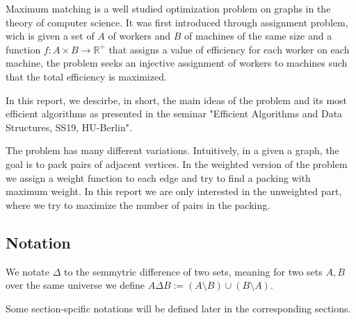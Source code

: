 Maximum matching is a well studied optimization problem on graphs in the theory of computer science. It was first introduced through assignment problem, wich is given a set of $A$ of workers and $B$ of machines of the same size and a function $f:A\times B \rightarrow \mathbb{R}^{+}$ that assigns a value of efficiency for each worker on each machine, the problem seeks an injective assignment of workers to machines such that the total efficiency is maximized.

In this report, we descirbe, in short, the main ideas of the problem and its most efficient algorithms as presented in the seminar "Efficient Algorithms and Data Structures, SS19, HU-Berlin".

The problem has many different variations. Intuitively, in a given a graph, the goal is to pack pairs of adjacent vertices. In the weighted version of the problem we assign a weight function to each edge and try to find a packing with maximum weight. In this report we are only interested in the unweighted part, where we try to maximize the number of pairs in the packing.

\subsection{Notation}
We notate $\Delta$  to the semmytric difference of two sets, meaning for two sets $A, B$ over the same universe we define $A\Delta B := \left( A \setminus B \right) \cup \left( B \setminus A \right)$.

Some section-spcific notations will be defined later in the corresponding sections.
